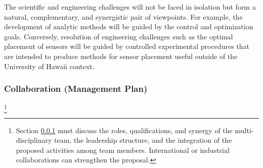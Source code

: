 The scientific and engineering challenges will not be faced in isolation
but form a natural, complementary, and synergistic pair of viewpoints. For
example, the development of analytic methods will be guided by the control
and optimization goals.  Conversely, resolution of engineering challenges
such as the optimal placement of sensors will be guided by controlled
experimental procedures that are intended to produce methods for sensor
placement useful outside of the University of Hawaii context.

\subsubsection{Collaboration (Management Plan)}
\label{sec:collaboration}

\footnote{Section \ref{sec:collaboration} must discuss the roles, qualifications, and
  synergy of the multi-disciplinary team, the leadership structure, and the
  integration of the proposed activities among team members.  
  International or industrial collaborations can strengthen the proposal.
}


